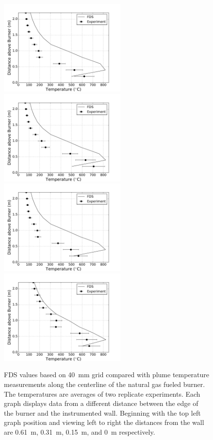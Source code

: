 \documentclass[twoside]{uocthesis}
\begin{document}
\begin{figure}[ht!]
  \centering
  \includegraphics[width=2.5in]{../Figures/IWGB_NG_TC_Plume_Avg_2D}
  \includegraphics[width=2.5in]{../Figures/IWGB_NG_TC_Plume_Avg_1D}\\
  \includegraphics[width=2.5in]{../Figures/IWGB_NG_TC_Plume_Avg_0p5D}
  \includegraphics[width=2.5in]{../Figures/IWGB_NG_TC_Plume_Avg_0D}\\
  \caption[FDS values based on 40~mm grid compared with plume temperature measurements along the centerline of the natural gas fueled burner]{FDS values based on 40~mm grid compared with plume temperature measurements along the centerline of the natural gas fueled burner. The temperatures are averages of two replicate experiments. Each graph displays data from a different distance between the edge of the burner and the instrumented wall.  Beginning with the top left graph position and viewing left to right the distances from the wall are 0.61~m, 0.31~m, 0.15~m, and 0~m respectively.}
  \label{FDS_TCPlume_IWGB_comp}
\end{figure}
\end{document}
